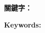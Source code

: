 \begin{abstractzh}

\bigbreak
\noindent \textbf{關鍵字：}{\, \makeatletter \@keywordszh \makeatother}
\end{abstractzh}

\begin{abstracten}

\bigbreak
\noindent \textbf{Keywords:}{\, \makeatletter \@keywordsen \makeatother}
\end{abstracten}

\begin{comment}
\category{I2.10}{Computing Methodologies}{Artificial Intelligence --
Vision and Scene Understanding} \category{H5.3}{Information
Systems}{Information Interfaces and Presentation (HCI) -- Web-based
Interaction.}

\terms{Design, Human factors, Performance.}

\keywords{Region of interest, Visual attention model, Web-based
games, Benchmarks.}
\end{comment}
